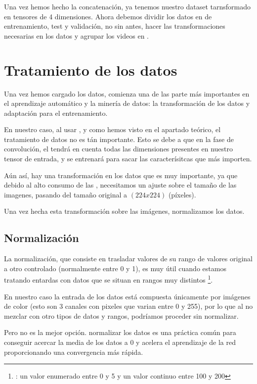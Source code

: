 Una vez hemos hecho la concatenación, ya tenemos nuestro dataset tarnsformado en tensores de 4 dimensiones. Ahora debemos dividir los datos en  de entrenamiento, test y validación, no sin antes, hacer las transformaciones necesarias en los datos y agrupar los videos en .


\section{Tratamiento de los datos}

Una vez hemos cargado los datos, comienza una de las parte más importantes en el aprendizaje automático y la minería de datos: la transformación de los datos y adaptación para el entrenamiento.

En nuestro caso, al usar , y como hemos visto en el apartado teórico, el tratamiento de datos no es tán importante. Esto se debe a que en la fase de convolución, el  tendrá en cuenta todas las dimensiones presentes en nuestro tensor de entrada, y se entrenará para sacar las caracterísitcas que más importen.

Aún así, hay una transformación en los datos que es muy importante, ya que debido al alto consumo de las , necesitamos un ajuste sobre el tamaño de las imagenes, pasando del tamaño original a $(224x224)$ (píxeles).

Una vez hecha esta transformación sobre las imágenes, normalizamos los datos.

\subsection{Normalización}

La normalización, que consiste en trasladar valores de su rango de valores original a otro controlado (normalmente entre 0 y 1), es muy útil cuando estamos tratando entardas con datos que se situan en rangos muy distintos \footnote{\pe: un valor enumerado entre 0 y 5 y un valor continuo entre 100 y 200}.

En nuestro caso la entrada de los datos está compuesta únicamente por imágenes de color (esto son 3 canales con pixeles que varian entre 0 y 255), por lo que al no mezclar con otro tipos de datos y rangos, podríamos proceder sin normalizar.

Pero no es la mejor opción. normalizar los datos es una práctica común para conseguir acercar la media de los datos a 0 y acelera el aprendizaje de la red proporcionando una convergencia más rápida.

